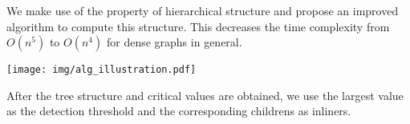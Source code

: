 \documentclass[portrait,final,a1paper,fontscale=0.3]{baposter}
\begin{document}
\begin{poster}
{We make use of the property of hierarchical structure and propose an improved algorithm to compute this structure. This decreases the time complexity from $O(n^5)$ to $O(n^4)$ for dense graphs in general.

{
\hspace{-1em}\texttt{[image: img/alg\_illustration.pdf]}
}

After the tree structure and critical values are obtained, we use the largest value as the detection threshold and the corresponding childrens as inliners.
}





\end{poster}
\end{document}
